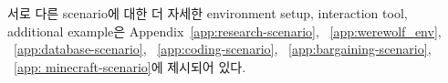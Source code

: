 
서로 다른 scenario에 대한 더 자세한 environment setup, interaction tool, additional example은 Appendix~\ref{app:research-scenario}, ~\ref{app:werewolf_env}, ~\ref{app:database-scenario}, ~\ref{app:coding-scenario}, ~\ref{app:bargaining-scenario}, ~\ref{app: minecraft-scenario}에 제시되어 있다.






